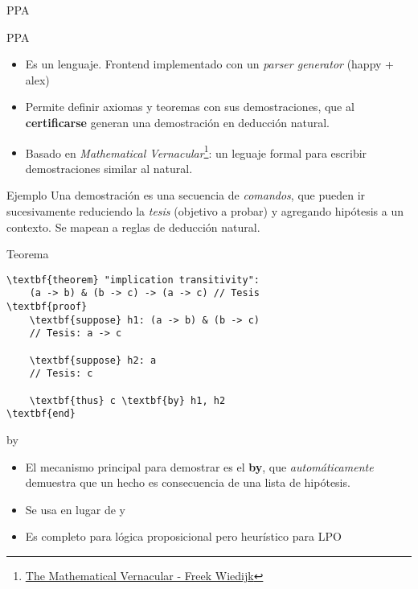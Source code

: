 \documentclass{beamer}
\begin{document}
\begin{frame}{PPA}
    \begin{figure}
    \centering
\end{figure}
\end{frame}

\begin{frame}{PPA}
    \begin{itemize}
        \item Es un lenguaje. Frontend implementado con un \textit{parser generator} (happy + alex)
        \item Permite definir axiomas y teoremas con sus demostraciones, que al \textbf{certificarse} generan una demostración en deducción natural.
        \item Basado en \textit{Mathematical Vernacular}\footnote{\href{https://www.cs.ru.nl/~freek/notes/mv.pdf}{The Mathematical Vernacular - Freek Wiedijk}}: un leguaje formal para escribir demostraciones similar al natural.
    \end{itemize}
\end{frame}


\begin{frame}[fragile]{Ejemplo}
    Una demostración es una secuencia de \textit{comandos}, que pueden ir sucesivamente reduciendo la \textit{tesis} (objetivo a probar) y agregando hipótesis a un contexto. Se mapean a reglas de deducción natural.

\begin{block}{Teorema}
    \begin{Verbatim}[commandchars=\\\{\}]
\textbf{theorem} "implication transitivity":
    (a -> b) & (b -> c) -> (a -> c) // Tesis
\textbf{proof}        
    \textbf{suppose} h1: (a -> b) & (b -> c)
    // Tesis: a -> c
    
    \textbf{suppose} h2: a
    // Tesis: c
    
    \textbf{thus} c \textbf{by} h1, h2
\textbf{end}
\end{Verbatim}

\end{block}
\end{frame}

\begin{frame}{by}
    \begin{itemize}
        \item El mecanismo principal para demostrar es el \textbf{by}, que \textit{automáticamente} demuestra que un hecho es consecuencia de una lista de hipótesis.
        \item Se usa en lugar de  y 
        \item Es completo para lógica proposicional pero heurístico para LPO
    \end{itemize}
\end{frame}
\end{document}
